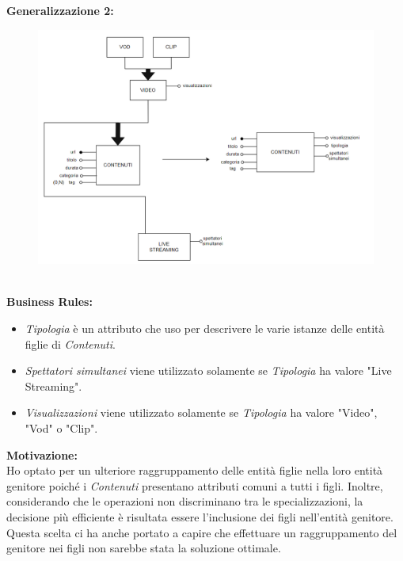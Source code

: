 \textbf{Generalizzazione 2:}\\
\begin{figure}[h]
    \centering
    \includegraphics[scale = 0.5]{img/generalizzazione2.png}
\end{figure}\\
\textbf{Business Rules:}
\begin{itemize}
    \item \textit{Tipologia} è un attributo che uso per descrivere le varie istanze delle entità figlie di \textit{Contenuti}.
    \item \textit{Spettatori simultanei} viene utilizzato solamente se \textit{Tipologia} ha valore "Live Streaming".
    \item \textit{Visualizzazioni} viene utilizzato solamente se \textit{Tipologia} ha valore "Video", "Vod" o "Clip".
\end{itemize}
\textbf{Motivazione:}\\
Ho optato per un ulteriore raggruppamento delle entità figlie nella loro entità genitore poiché i \textit{Contenuti} presentano attributi comuni a tutti i figli. Inoltre, considerando che le operazioni non discriminano tra le specializzazioni, la decisione più efficiente è risultata essere l'inclusione dei figli nell'entità genitore. Questa scelta ci ha anche portato a capire che effettuare un raggruppamento del genitore nei figli non sarebbe stata la soluzione ottimale.














